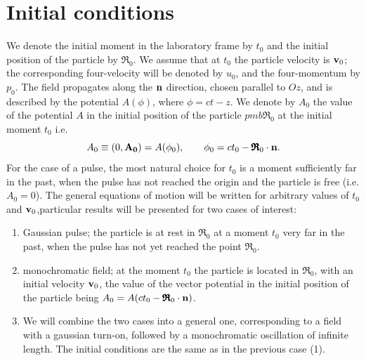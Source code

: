 


\section{Initial conditions}{\label{sect_in}}

We denote the initial moment in the laboratory frame by \(t_0\) and the initial position of the particle by \({\pmb{\mathfrak R}}_0\). We assume that at \(t_0\) the particle velocity is \({\bf v}_0\);  the corresponding four-velocity will be denoted by \( u_0\), and the four-momentum by \( p_0\). The field propagates along the \({\bf n}\) direction, chosen parallel to \(Oz\), and is described by the potential \( A(\phi)\), where \(\phi = ct - z\). We denote by  \({ A}_0\)  the value of the  potential \({ A}\) in the initial position of the particle \({pmb{\mathfrak R}_0}\)  at the initial moment \(t_0\) i.e.
\begin{equation}
    A_0\equiv(0,{\bf A_0})= A(\phi_0), \qquad \phi_0=ct_0 - {\pmb{\mathfrak R}_0}\cdot {\bf n}.
\end{equation}
For the case of a pulse, the most natural choice for \(t_0\) is a moment sufficiently far in the past, when the pulse has not reached the origin  and the particle is free (i.e. \( A_0= 0\)).
The general equations of motion will be written for arbitrary values of \(t_0\) and \({\bf v}_0\),particular results will be presented for two cases of interest:


\begin{enumerate}
    \item Gaussian pulse; the particle is at rest in \({\pmb{\mathfrak R}}_0\) at a moment \(t_0\) very far in the past, when the pulse has not yet reached the point \({\pmb{\mathfrak R}}_0\).
    \item monochromatic field; at the moment \(t_0\)  the particle is located in \({\pmb{\mathfrak R}}_0\), with an initial velocity \({\bf v}_0\), the value of the vector potential in the initial position of the particle being \(A_0= A(ct_0 - {\pmb{\mathfrak R}}_0 \cdot {\bf n})\).
    \item We will combine the two cases into a general one, corresponding to a field with a gaussian turn-on, followed by a monochromatic oscillation of infinite length. The initial conditions are the same as in the previous case (1).
\end{enumerate}

